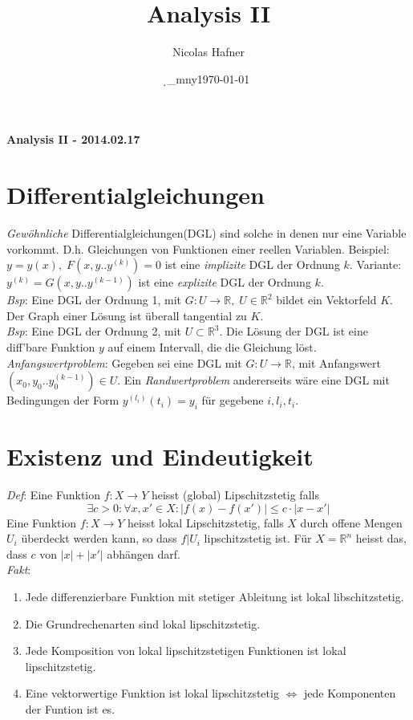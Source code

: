 \documentclass[12pt,a4paper,titlepage]{article}
\author{Nicolas Hafner}
\title{Analysis II}
\date{\d_mny\today}
\begin{document}
	
\begin{center}{\bfseries\Huge Analysis II - 2014.02.17}\end{center}
\section*{Differentialgleichungen}
\emph{Gewöhnliche} Differentialgleichungen(DGL) sind solche in denen nur eine Variable vorkommt. D.h. Gleichungen von Funktionen einer reellen Variablen. Beispiel: $y=y(x),\; F(x,y..y^{(k)})=0$ ist eine \emph{implizite} DGL der Ordnung $k$. Variante: $y^{(k)}=G(x,y..y^{(k-1)})$ ist eine \emph{explizite} DGL der Ordnung $k$. \\

\textit{Bsp}: Eine DGL der Ordnung 1, mit $G:U\to\mathbb{R},\; U\in\mathbb{R}^2$ bildet ein Vektorfeld $K$. Der Graph einer Lösung ist überall tangential zu $K$. \\

\textit{Bsp}: Eine DGL der Ordnung 2, mit $U\subset\mathbb{R}^3$. Die Lösung der DGL ist eine diff'bare Funktion $y$ auf einem Intervall, die die Gleichung löst. \\

\emph{Anfangswertproblem}: Gegeben sei eine DGL mit $G:U\to\mathbb{R}$, mit Anfangswert $(x_0,y_0..y^{(k-1)}_0)\in U$. Ein \emph{Randwertproblem} andererseits wäre eine DGL mit Bedingungen der Form $y^{(l_i)}(t_i)=y_i$ für gegebene $i,l_i,t_i$.

\section*{Existenz und Eindeutigkeit}
\textit{Def}: Eine Funktion $f:X\to Y$ heisst (global) Lipschitzstetig falls
$$\exists c>0:\forall x,x'\in X:|f(x)-f(x')|\leq c\cdot|x-x'|$$
Eine Funktion $f:X\to Y$ heisst lokal Lipschitzstetig, falls $X$ durch offene Mengen $U_i$ überdeckt werden kann, so dass $f|U_i$ lipschitzstetig ist. Für $X=\mathbb{R}^n$ heisst das, dass $c$ von $|x|+|x'|$ abhängen darf. \\

\textit{Fakt}: \begin{enumerate}[label=(\alph*)]
\item Jede differenzierbare Funktion mit stetiger Ableitung ist lokal libschitzstetig.
\item Die Grundrechenarten sind lokal lipschitzstetig.
\item Jede Komposition von lokal lipschitzstetigen Funktionen ist lokal lipschitzstetig.
\item Eine vektorwertige Funktion ist lokal lipschitzstetig $\Leftrightarrow$ jede Komponenten der Funtion ist es.
\end{enumerate}
\end{document}
